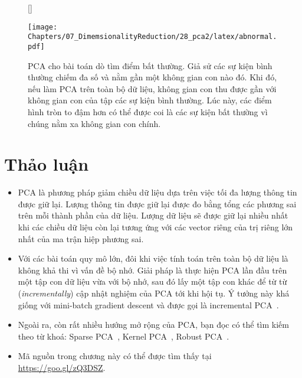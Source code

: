 \begin{figure}[t]

[\FBwidth]
{\caption{ PCA cho bài toán dò tìm điểm bất thường. Giả sử
các sự kiện {bình thường} chiếm đa số và nằm gần  một không
gian con nào đó. Khi đó, nếu làm PCA trên toàn bộ dữ liệu, không gian con
thu được gần với không gian con của tập các sự kiện {bình thường}.
Lúc này, các
điểm hình tròn to đậm hơn có thể được coi là các sự kiện {bất thường} vì chúng nằm xa không gian con chính.}
\label{fig:28_4}}
{ %
\texttt{[image: Chapters/07\_DimemsionalityReduction/28\_pca2/latex/abnormal.pdf]}
}
\end{figure}


\section{Thảo luận}
\begin{itemize}
\item PCA là phương pháp giảm chiều dữ liệu dựa trên việc tối đa lượng
thông tin được giữ lại. Lượng thông tin được giữ lại được đo bằng tổng các
phương sai trên mỗi thành phần của dữ liệu. Lượng dữ liệu sẽ được giữ lại nhiều
nhất khi các chiều dữ liệu còn lại tương ứng với các vector riêng của trị riêng
lớn nhất của ma trận hiệp phương sai.

\item Với các bài toán quy mô lớn, đôi khi việc tính toán trên toàn bộ dữ liệu
là không khả thi vì vấn đề bộ nhớ. Giải pháp là thực hiện PCA lần đầu
trên một tập con dữ liệu vừa với bộ nhớ, sau đó lấy một tập con khác để {từ từ} (\textit{incrementally}) cập nhật nghiệm của PCA tới khi hội
tụ. Ý tưởng này khá giống với mini-batch gradient descent và được gọi là
incremental PCA~\cite{zhao2006novel}.

\item Ngoài ra, còn rất nhiều hướng mở rộng của PCA, bạn đọc có thể tìm kiếm
theo từ khoá: Sparse PCA~\cite{d2005direct}, Kernel PCA~\cite{mika1999kernel},
Robust PCA~\cite{candes2011robust}.

\item Mã nguồn trong chương này có thể được tìm thấy tại
\url{https://goo.gl/zQ3DSZ}.
\end{itemize}

